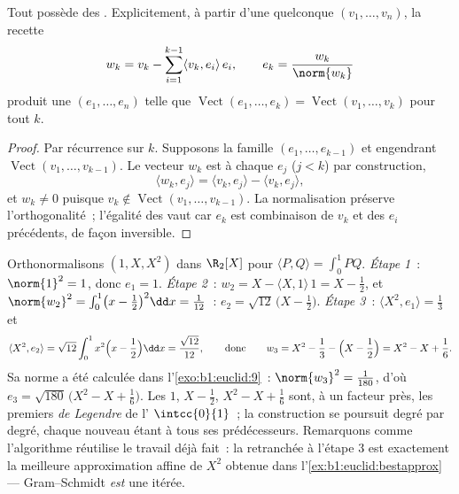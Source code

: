 \begin{theorem}\label{thm:b1:euclid:gramschmidt}
Tout  possède des  . Explicitement,
à partir d'une  quelconque $(v_1, \dots, v_n)$, la
recette
\[
w_k = v_k - \sum_{i=1}^{k-1} \langle v_k, e_i\rangle\, e_i ,
\qquad
e_k = \frac{w_k}{\norm{w_k}}
\]
produit une   $(e_1, \dots, e_n)$ telle que
$\operatorname{Vect}(e_1, \dots, e_k) = \operatorname{Vect}(v_1,
\dots, v_k)$ pour tout $k$.
\end{theorem}

\begin{proof}
Par récurrence sur $k$. Supposons la famille $(e_1, \dots, e_{k-1})$
 et engendrant
$\operatorname{Vect}(v_1, \dots, v_{k-1})$. Le vecteur $w_k$ est
 à chaque $e_j$ ($j < k$)
par construction,
\[
\langle w_k, e_j \rangle = \langle v_k, e_j\rangle - \langle v_k, e_j\rangle,
\]
et $w_k \neq 0$ puisque
$v_k \notin \operatorname{Vect}(v_1, \dots, v_{k-1})$. La
normalisation préserve l'orthogonalité~; l'égalité des  vaut car $e_k$ est combinaison de $v_k$ et des $e_i$
précédents, de façon inversible.
\end{proof}

\begin{example}
\label{ex:b1:euclid:legendre}
Orthonormalisons $(1, X, X^2)$ dans $\R_2[X]$ pour $\langle P,
Q\rangle = \int_0^1 PQ$. \emph{Étape 1}~: $\norm{1}^2 = 1$, donc
$e_1 = 1$. \emph{Étape 2}~: $w_2 = X - \langle X, 1\rangle\,1 = X -
\frac12$, et $\norm{w_2}^2 = \int_0^1\bigl(x - \frac12\bigr)^2
\dd x = \frac1{12}$~: $e_2 = \sqrt{12}\,\bigl(X - \frac12\bigr)$.
\emph{Étape 3}~: $\langle X^2, e_1\rangle = \frac13$ et
\[
\langle X^2, e_2\rangle
= \sqrt{12}\int_0^1 x^2\Bigl(x - \frac12\Bigr)\dd x
= \frac{\sqrt{12}}{12},
\qquad\text{donc}\qquad
w_3 = X^2 - \frac13 - \Bigl(X - \frac12\Bigr)
= X^2 - X + \frac16 .
\]
Sa norme a été calculée dans l'\cref{exo:b1:euclid:9}~: $\norm{w_3}^2
= \frac1{180}$, d'où $e_3 = \sqrt{180}\,\bigl(X^2 - X +
\frac16\bigr)$. Les  $1$, $X - \frac12$, $X^2 - X +
\frac16$ sont, à un facteur près, les premiers \emph{ de
Legendre} de l' $\intcc{0}{1}$~; la construction se
poursuit degré par degré, chaque nouveau  étant 
à tous ses prédécesseurs. Remarquons comme l'algorithme réutilise
le travail déjà fait~: la  retranchée à l'étape 3 est
exactement la meilleure approximation affine de $X^2$ obtenue dans
l'\cref{ex:b1:euclid:bestapprox} --- Gram--Schmidt \emph{est} une
 itérée.
\end{example}

